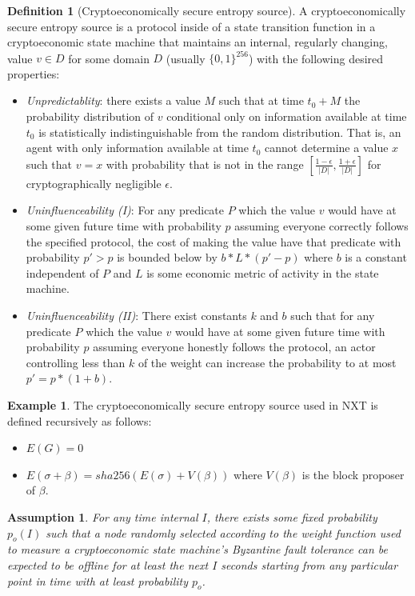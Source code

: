 \documentclass[11pt,a4paper]{report}
\theoremstyle{plain}
\newtheorem{assm}{Assumption}[chapter]
\theoremstyle{definition}
\newtheorem{defn}{Definition}[chapter]
\newtheorem{exmp}{Example}[section]
\theoremstyle{remark}
\begin{document}
\begin{defn}[Cryptoeconomically secure entropy source]
A cryptoeconomically secure entropy source is a protocol inside of a state transition function in a cryptoeconomic state machine that maintains an internal, regularly changing, value $v \in D$ for some domain $D$ (usually $\{0,1\}^{256}$) with the following desired properties:
\begin{itemize}
\item \emph{Unpredictablity}: there exists a value $M$ such that at time $t_0 + M$ the probability distribution of $v$ conditional only on information available at time $t_0$ is statistically indistinguishable from the random distribution. That is, an agent with only information available at time $t_0$ cannot determine a value $x$ such that $v = x$ with probability that is not in the range $[\frac{1 - \epsilon}{|D|}, \frac{1 + \epsilon}{|D|}]$ for cryptographically negligible $\epsilon$.
\item \emph{Uninfluenceability (I)}: For any predicate $P$ which the value $v$ would have at some given future time with probability $p$ assuming everyone correctly follows the specified protocol, the cost of making the value have that predicate with probability $p' > p$ is bounded below by $b * L * (p' - p)$ where $b$ is a constant independent of $P$ and $L$ is some economic metric of activity in the state machine.
\item \emph{Uninfluenceability (II)}: There exist constants $k$ and $b$ such that for any predicate $P$ which the value $v$ would have at some given future time with probability $p$ assuming everyone honestly follows the protocol, an actor controlling less than $k$ of the weight can increase the probability to at most $p' = p * (1 + b)$.
\end{itemize}
\end{defn}

\begin{exmp}
The cryptoeconomically secure entropy source used in NXT\cite{nxtinside} is defined recursively as follows:
\begin{itemize}
\item
$E(G) = 0$
\item 
$E(\sigma + \beta) = sha256(E(\sigma) + V(\beta))$ where $V(\beta)$ is the block proposer of $\beta$.
\end{itemize}
\end{exmp}

\begin{assm}
For any time internal $I$, there exists some fixed probability $p_o(I)$ such that a node randomly selected according to the weight function used to measure a cryptoeconomic state machine's Byzantine fault tolerance can be expected to be offline for at least the next $I$ seconds starting from any particular point in time with at least probability $p_o$.
\end{assm}
\end{document}
